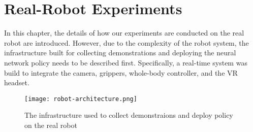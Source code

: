 \chapter{Real-Robot Experiments}

In this chapter, the details of how our experiments are conducted on the real robot are introduced. 
However, due to the complexity of the robot system, the infrastructure built for collecting demonstrations and deploying the neural network policy needs to be described first. Specifically, a real-time system was build to integrate the camera, grippers, whole-body controller, and the VR headset. 

\begin{figure}
	\centering
	\texttt{[image: robot-architecture.png]}
	\caption{The infrastructure used to collect demonstraions and deploy policy on the real robot}
    \label{fig:robot-architecture}
\end{figure}


